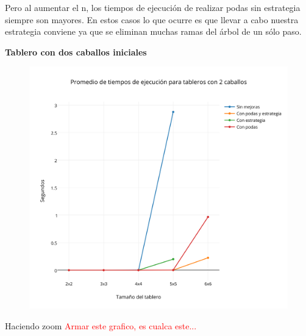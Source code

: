 Pero al aumentar el n, los tiempos de ejecución de realizar podas sin estrategia siempre son mayores. En estos casos lo que ocurre es que llevar a cabo nuestra estrategia conviene ya que se eliminan muchas ramas del árbol de un sólo paso.

\newpage

\textbf{{\Large Tablero con dos caballos iniciales}}
 \begin{figure}[h!]
   \begin{center}
   	\includegraphics[scale=0.3]{../src/ej3/Mediciones/2caballos/promedios1.png} 
   \end{center}
 \end{figure}
   \newpage

 Haciendo zoom \textcolor{red}{Armar este grafico, es cualca este...}


